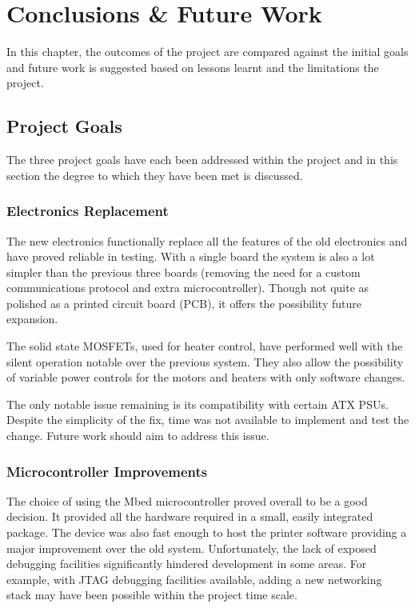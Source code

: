 \chapter{Conclusions \& Future Work}
	
	\label{sec:conclusions}
	
	In this chapter, the outcomes of the project are compared against the initial
	goals and future work is suggested based on lessons learnt and the limitations
	the project.
	
	\section{Project Goals}
		
		The three project goals have each been addressed within the project and in
		this section the degree to which they have been met is discussed.
		
		\subsection{Electronics Replacement}
			
			The new electronics functionally replace all the features of the old
			electronics and have proved reliable in testing.  With a single board the
			system is also a lot simpler than the previous three boards (removing the
			need for a custom communications protocol and extra microcontroller).
			Though not quite as polished as a printed circuit board (PCB), it offers
			the possibility future expansion.
			
			The solid state MOSFETs, used for heater control, have performed well with
			the silent operation notable over the previous system. They also allow the
			possibility of variable power controls for the motors and heaters with
			only software changes.
			
			The only notable issue remaining is its compatibility with certain ATX
			PSUs. Despite the simplicity of the fix, time was not available to
			implement and test the change. Future work should aim to address this
			issue.
		
		\subsection{Microcontroller Improvements}
			
			The choice of using the Mbed microcontroller proved overall to be a good
			decision. It provided all the hardware required in a small, easily
			integrated package. The device was also fast enough to host the printer
			software providing a major improvement over the old system. Unfortunately,
			the lack of exposed debugging facilities significantly hindered
			development in some areas. For example, with JTAG debugging facilities
			available, adding a new networking stack may have been possible within the
			project time scale.
			
